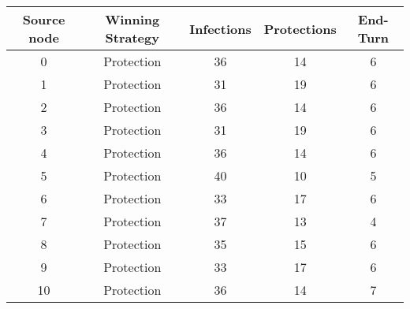 \documentclass[results.tex]{subfiles}
\begin{document}
    \begin{center}
        \begin{tabular}{| c || c | c | c | c |}
            \hline
            {\bfseries Source node} & {\bfseries Winning Strategy} & {\bfseries Infections} & {\bfseries Protections}
            & {\bfseries End-Turn}
            \\  %
            \hline\hline
            0                       & Protection                   & 36                     & 14                      & 6                    \\
            \hline
            1                       & Protection                   & 31                     & 19                      & 6                    \\
            \hline
            2                       & Protection                   & 36                     & 14                      & 6                    \\
            \hline
            3                       & Protection                   & 31                     & 19                      & 6                    \\
            \hline
            4                       & Protection                   & 36                     & 14                      & 6                    \\
            \hline
            5                       & Protection                   & 40                     & 10                      & 5                    \\
            \hline
            6                       & Protection                   & 33                     & 17                      & 6                    \\
            \hline
            7                       & Protection                   & 37                     & 13                      & 4                    \\
            \hline
            8                       & Protection                   & 35                     & 15                      & 6                    \\
            \hline
            9                       & Protection                   & 33                     & 17                      & 6                    \\
            \hline
            10                      & Protection                   & 36                     & 14                      & 7                    \\

\end{tabular}
\end{center}
\end{document}
